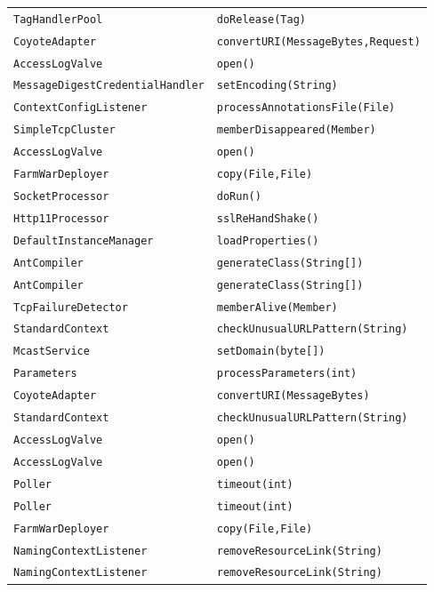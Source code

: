 \begin{center}
\begin{longtable}{ll}
\lstinline/TagHandlerPool/&{\lstinline/doRelease(Tag)/}\\
\lstinline/CoyoteAdapter/&{\lstinline/convertURI(MessageBytes,Request)/}\\
\lstinline/AccessLogValve/&{\lstinline/open()/}\\
\lstinline/MessageDigestCredentialHandler/&{\lstinline/setEncoding(String)/}\\
\lstinline/ContextConfigListener/&{\lstinline/processAnnotationsFile(File)/}\\
\lstinline/SimpleTcpCluster/&{\lstinline/memberDisappeared(Member)/}\\
\lstinline/AccessLogValve/&{\lstinline/open()/}\\
\lstinline/FarmWarDeployer/&{\lstinline/copy(File,File)/}\\
\lstinline/SocketProcessor/&{\lstinline/doRun()/}\\
\lstinline/Http11Processor/&{\lstinline/sslReHandShake()/}\\
\lstinline/DefaultInstanceManager/&{\lstinline/loadProperties()/}\\
\lstinline/AntCompiler/&{\lstinline/generateClass(String[])/}\\
\lstinline/AntCompiler/&{\lstinline/generateClass(String[])/}\\
\lstinline/TcpFailureDetector/&{\lstinline/memberAlive(Member)/}\\
\lstinline/StandardContext/&{\lstinline/checkUnusualURLPattern(String)/}\\
\lstinline/McastService/&{\lstinline/setDomain(byte[])/}\\
\lstinline/Parameters/&{\lstinline/processParameters(int)/}\\
\lstinline/CoyoteAdapter/&{\lstinline/convertURI(MessageBytes)/}\\
\lstinline/StandardContext/&{\lstinline/checkUnusualURLPattern(String)/}\\
\lstinline/AccessLogValve/&{\lstinline/open()/}\\
\lstinline/AccessLogValve/&{\lstinline/open()/}\\
\lstinline/Poller/&{\lstinline/timeout(int)/}\\
\lstinline/Poller/&{\lstinline/timeout(int)/}\\
\lstinline/FarmWarDeployer/&{\lstinline/copy(File,File)/}\\
\lstinline/NamingContextListener/&{\lstinline/removeResourceLink(String)/}\\
\lstinline/NamingContextListener/&{\lstinline/removeResourceLink(String)/}\\

\end{longtable}
\end{center}
